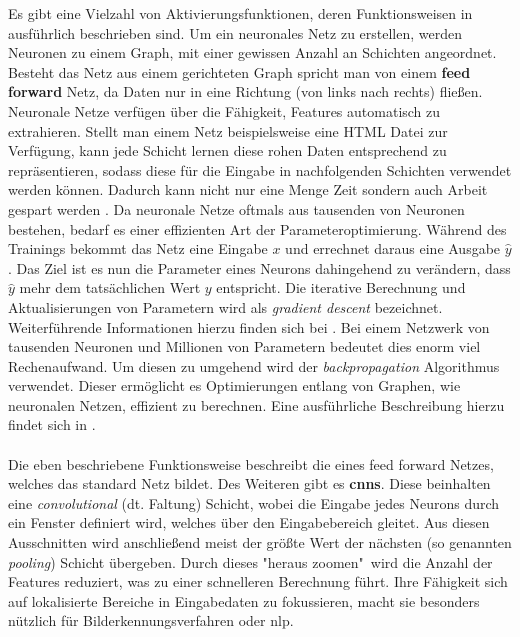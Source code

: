 \documentclass[
    12pt, %
    DIV10,
    ngerman, %
    a4paper, %
    oneside, %
    titlepage, %
    parskip=half, %
    headings=normal, %
    listof=totoc, %
    bibliography=totoc, %
    index=totoc, %
    captions=tableheading, %
    final %
]{scrreprt}
\begin{document}
Es gibt eine Vielzahl von Aktivierungsfunktionen, deren Funktionsweisen in \textcite{JoshuaSaxe2018} ausführlich beschrieben sind. Um ein neuronales Netz zu erstellen, werden Neuronen zu einem Graph, mit einer gewissen Anzahl an Schichten angeordnet. Besteht das Netz aus einem gerichteten Graph spricht man von einem \textbf{feed forward} Netz, da Daten nur in eine Richtung (von links nach rechts) flie{\ss}en. Neuronale Netze verfügen über die Fähigkeit, Features automatisch zu extrahieren. Stellt man einem Netz  beispielsweise eine HTML Datei zur Verfügung, kann jede Schicht lernen diese rohen Daten entsprechend zu repräsentieren, sodass diese für die Eingabe in nachfolgenden Schichten verwendet werden können. Dadurch kann nicht nur eine Menge Zeit sondern auch Arbeit gespart werden \parencite{JoshuaSaxe2018}. Da neuronale Netze oftmals aus tausenden von Neuronen bestehen, bedarf es einer effizienten Art der Parameteroptimierung. Während des Trainings bekommt das Netz eine Eingabe $x$ und errechnet daraus eine Ausgabe $\hat{y}$. Das Ziel ist es nun die Parameter eines Neurons dahingehend zu verändern, dass $\hat{y}$ mehr dem tatsächlichen Wert $y$ entspricht. Die iterative Berechnung und Aktualisierungen von Parametern wird als \emph{gradient descent} bezeichnet. Weiterführende Informationen hierzu finden sich bei \textcite{bonaccorso2018python}. Bei einem Netzwerk von tausenden Neuronen und Millionen von Parametern bedeutet dies enorm viel Rechenaufwand. Um diesen zu umgehend wird der \emph{backpropagation} Algorithmus verwendet. Dieser ermöglicht es Optimierungen entlang von Graphen, wie neuronalen Netzen, effizient zu berechnen. Eine ausführliche Beschreibung hierzu findet sich in \textcite{krohn2019deep}.\\\\
Die eben beschriebene Funktionsweise beschreibt die eines feed forward Netzes, welches das standard Netz bildet. Des Weiteren gibt es \textbf{\ac{cnns}}. Diese beinhalten eine \emph{convolutional} (dt. Faltung) Schicht, wobei die Eingabe jedes Neurons durch ein Fenster definiert wird, welches über den Eingabebereich gleitet. Aus diesen Ausschnitten wird anschlie{\ss}end meist der grö{\ss}te Wert der nächsten (so genannten \emph{pooling}) Schicht übergeben. Durch dieses "heraus zoomen"\ wird die Anzahl der Features reduziert, was zu einer schnelleren Berechnung führt. Ihre Fähigkeit sich auf lokalisierte Bereiche in Eingabedaten zu fokussieren, macht sie besonders nützlich für Bilderkennungsverfahren oder \ac{nlp}.\\\\
\end{document}
